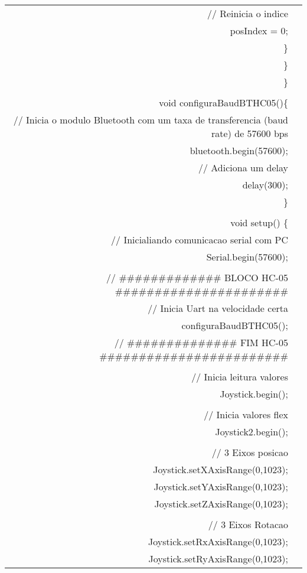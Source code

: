 \begin{longtable}{Rp{15cm}}
\qquad \qquad \qquad        // Reinicia o indice \\
\qquad \qquad \qquad        posIndex = 0; \\          
\qquad \qquad      \} \\
\qquad    \} \\
\} \\
\\
void configuraBaudBTHC05()\{ \\
\qquad  // Inicia o modulo Bluetooth com um taxa de transferencia (baud rate) de 57600 bps\\
\qquad  bluetooth.begin(57600);\\  
\qquad  // Adiciona um delay \\
\qquad  delay(300); \\
\} \\
\\
void setup() \{ \\
\qquad  // Inicialiando comunicacao serial com PC \\
\qquad  Serial.begin(57600); \\ 
\\
\qquad  // \#\#\#\#\#\#\#\#\#\#\#\#\# BLOCO HC-05 \#\#\#\#\#\#\#\#\#\#\#\#\#\#\#\#\#\#\#\#\#\# \\
\qquad      // Inicia Uart na velocidade certa \\
\qquad        configuraBaudBTHC05(); \\
\qquad  // \#\#\#\#\#\#\#\#\#\#\#\#\#\# FIM HC-05 \#\#\#\#\#\#\#\#\#\#\#\#\#\#\#\#\#\#\#\#\#\#\#\# \\
  \\
\qquad  // Inicia leitura valores  \\
\qquad  Joystick.begin(); \\
  \\
\qquad  // Inicia valores flex \\
\qquad  Joystick2.begin(); \\ 
  \\
\qquad  // 3 Eixos posicao \\
\qquad  Joystick.setXAxisRange(0,1023); \\
\qquad  Joystick.setYAxisRange(0,1023); \\
\qquad  Joystick.setZAxisRange(0,1023);  \\
\\
\qquad  // 3 Eixos Rotacao \\
\qquad  Joystick.setRxAxisRange(0,1023); \\
\qquad  Joystick.setRyAxisRange(0,1023);  \\

\end{longtable}
